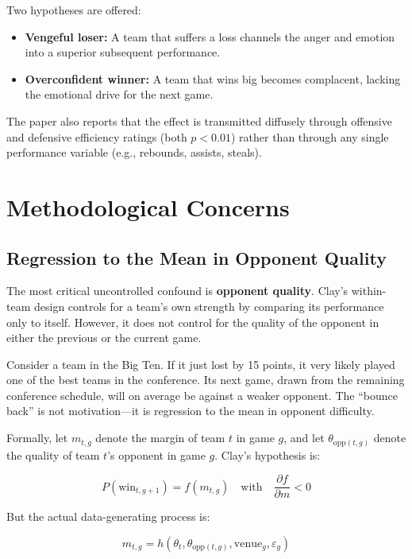 \documentclass[11pt]{article}
\begin{document}
\noindent Two hypotheses are offered:
\begin{itemize}
    \item \textbf{Vengeful loser:} A team that suffers a loss channels the anger and emotion into a superior subsequent performance.
    \item \textbf{Overconfident winner:} A team that wins big becomes complacent, lacking the emotional drive for the next game.
\end{itemize}

\noindent The paper also reports that the effect is transmitted diffusely through offensive and defensive efficiency ratings (both $p < 0.01$) rather than through any single performance variable (e.g., rebounds, assists, steals).

\section{Methodological Concerns}

\subsection{Regression to the Mean in Opponent Quality}

The most critical uncontrolled confound is \textbf{opponent quality}. Clay's within-team design controls for a team's own strength by comparing its performance only to itself. However, it does not control for the quality of the opponent in either the previous or the current game.

Consider a team in the Big Ten. If it just lost by 15 points, it very likely played one of the best teams in the conference. Its next game, drawn from the remaining conference schedule, will on average be against a weaker opponent. The ``bounce back'' is not motivation---it is regression to the mean in opponent difficulty.

Formally, let $m_{t,g}$ denote the margin of team $t$ in game $g$, and let $\theta_{\text{opp}(t,g)}$ denote the quality of team $t$'s opponent in game $g$. Clay's hypothesis is:

\begin{equation}
P(\text{win}_{t,g+1}) = f(m_{t,g}) \quad \text{with} \quad \frac{\partial f}{\partial m} < 0
\label{eq:clay_hypothesis}
\end{equation}

\noindent But the actual data-generating process is:

\begin{equation}
m_{t,g} = h(\theta_t, \theta_{\text{opp}(t,g)}, \text{venue}_g, \varepsilon_g)
\label{eq:dgp}
\end{equation}
\end{document}
